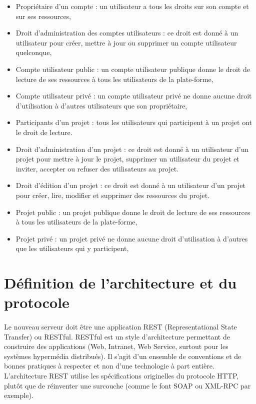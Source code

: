\documentclass{report}
\begin{document}
\begin{itemize}
\item Propriétaire d'un compte : un utilisateur a tous les droits sur son compte et sur ses ressources,
\item Droit d'administration des comptes utilisateurs : ce droit est donné à un utilisateur pour créer, mettre à jour ou
supprimer un compte utilisateur quelconque,
\item Compte utilisateur public : un compte utilisateur publique donne le droit de lecture de ses ressources à tous les
utilisateurs de la plate-forme,
\item Compte utilisateur privé : un compte utilisateur privé ne donne aucune droit d'utilisation à d'autres utilisateurs que
son propriétaire,
\item Participants d'un projet : tous les utilisateurs qui participent à un projet ont le droit de lecture.
\item Droit d'administration d'un projet : ce droit est donné à un utilisateur d'un projet pour mettre à jour le projet, 
supprimer un utilisateur du projet et inviter, accepter ou refuser des utilisateurs au projet.
\item Droit d'édition d'un projet : ce droit est donné à un utilisateur d'un projet pour créer, lire, modifier et supprimer 
des ressources du projet.
\item Projet public : un projet publique donne le droit de lecture de ses ressources à tous les utilisateurs de la 
plate-forme,
\item Projet privé : un projet privé ne donne aucune droit d'utilisation à d'autres que les utilisateurs qui y
participent,
\end{itemize}






\section{Définition de l'architecture et du protocole}
\paragraph{}
Le nouveau serveur doit être une application REST (Representational State Transfer) ou RESTful. RESTful est un style
d’architecture permettant de construire des applications (Web, Intranet, Web Service, surtout pour les systèmes 
hypermédia distribués). Il s’agit d’un ensemble de conventions et de bonnes pratiques à respecter et non d’une 
technologie à part entière. L’architecture REST utilise les spécifications originelles du protocole HTTP, plutôt que de
réinventer une surcouche (comme le font SOAP ou XML-RPC par exemple).
\end{document}
